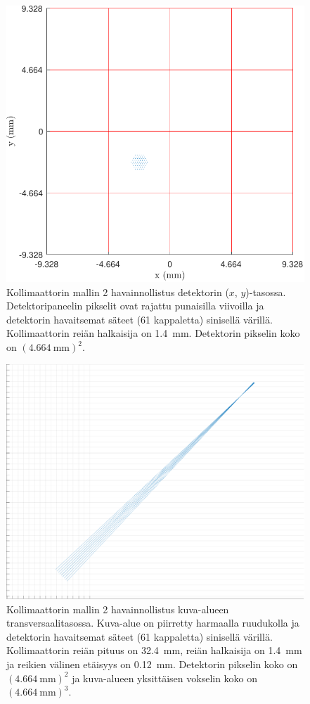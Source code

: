 \begin{figure}[H]
    \centering
    \captionsetup{width=.9\linewidth}
    \includegraphics[width=.9\linewidth]{kuvat/malli2_2D.pdf}
    \caption{Kollimaattorin mallin 2 havainnollistus detektorin ($x$, $y$)-tasossa. Detektoripaneelin pikselit ovat rajattu punaisilla viivoilla ja detektorin havaitsemat säteet (61 kappaletta) sinisellä värillä. Kollimaattorin reiän halkaisija on \qty{1.4}{\milli\meter}. Detektorin pikselin koko on $(\qty{4.664}{\milli\meter})^2$.}
    \label{fig:ray2_2D}
\end{figure}
\begin{figure}[H]
    \centering
    \captionsetup{width=.9\linewidth}
    \includegraphics[width=.9\linewidth]{kuvat/malli2_3D.pdf}
    \caption{Kollimaattorin mallin 2 havainnollistus kuva-alueen transversaalitasossa. Kuva-alue on piirretty harmaalla ruudukolla ja detektorin havaitsemat säteet (61 kappaletta) sinisellä värillä. Kollimaattorin reiän pituus on \qty{32.4}{\milli\meter}, reiän halkaisija on \qty{1.4}{\milli\meter} ja reikien välinen etäisyys on \qty{0.12}{\milli\meter}. Detektorin pikselin koko on $(\qty{4.664}{\milli\meter})^2$ ja kuva-alueen yksittäisen vokselin koko on $(\qty{4.664}{\milli\meter})^{3}$.}
    \label{fig:ray2_3D}
\end{figure}
